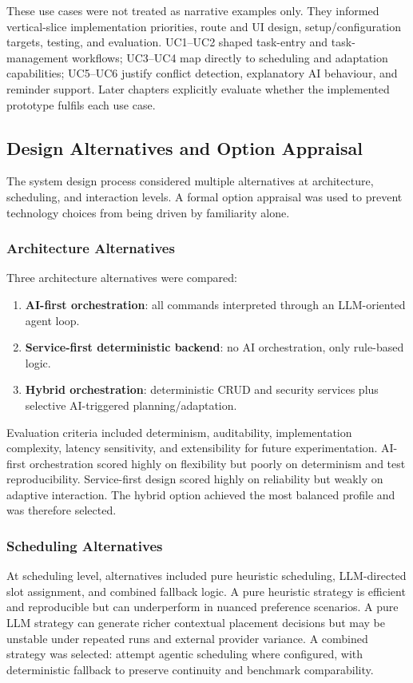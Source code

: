 \documentclass[12pt]{article}
\begin{document}
These use cases were not treated as narrative examples only. They informed vertical-slice implementation priorities, route and UI design, setup/configuration targets, testing, and evaluation. UC1--UC2 shaped task-entry and task-management workflows; UC3--UC4 map directly to scheduling and adaptation capabilities; UC5--UC6 justify conflict detection, explanatory AI behaviour, and reminder support. Later chapters explicitly evaluate whether the implemented prototype fulfils each use case.

\subsection{Design Alternatives and Option Appraisal}
The system design process considered multiple alternatives at architecture, scheduling, and interaction levels. A formal option appraisal was used to prevent technology choices from being driven by familiarity alone.

\subsubsection{Architecture Alternatives}
Three architecture alternatives were compared:
\begin{enumerate}
    \item \textbf{AI-first orchestration}: all commands interpreted through an LLM-oriented agent loop.
    \item \textbf{Service-first deterministic backend}: no AI orchestration, only rule-based logic.
    \item \textbf{Hybrid orchestration}: deterministic CRUD and security services plus selective AI-triggered planning/adaptation.
\end{enumerate}

Evaluation criteria included determinism, auditability, implementation complexity, latency sensitivity, and extensibility for future experimentation. AI-first orchestration scored highly on flexibility but poorly on determinism and test reproducibility. Service-first design scored highly on reliability but weakly on adaptive interaction. The hybrid option achieved the most balanced profile and was therefore selected.

\subsubsection{Scheduling Alternatives}
At scheduling level, alternatives included pure heuristic scheduling, LLM-directed slot assignment, and combined fallback logic. A pure heuristic strategy is efficient and reproducible but can underperform in nuanced preference scenarios. A pure LLM strategy can generate richer contextual placement decisions but may be unstable under repeated runs and external provider variance. A combined strategy was selected: attempt agentic scheduling where configured, with deterministic fallback to preserve continuity and benchmark comparability.
\end{document}
